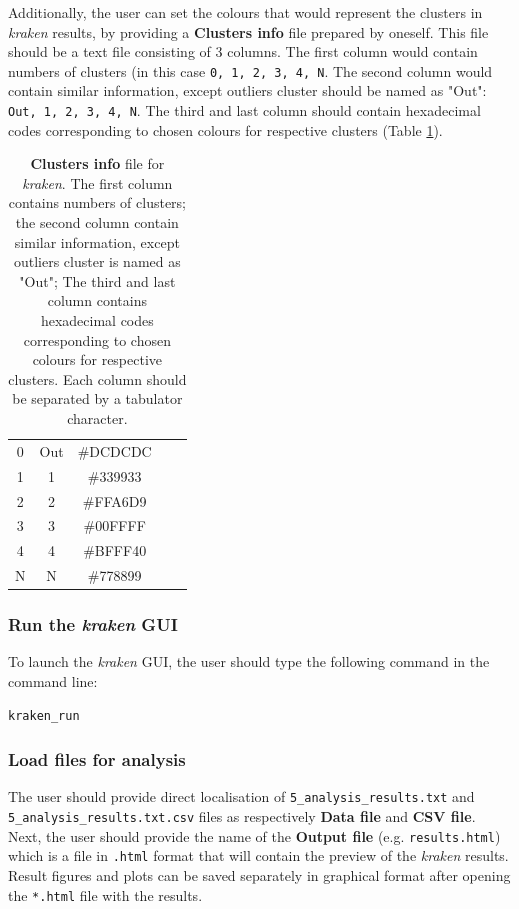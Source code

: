 \documentclass[9pt,tutorial, pubversion]{livecoms}
\begin{document}
Additionally, the user can set the colours that would represent the clusters in \textit{kraken} results, by providing a \textbf{Clusters info} file prepared by oneself. This file should be a text file consisting of 3 columns. The first column would contain numbers of clusters (in this case \texttt{0, 1, 2, 3, 4, N}. The second column would contain similar information, except outliers cluster should be named as "Out": \texttt{Out, 1, 2, 3, 4, N}. The third and last column should contain hexadecimal codes corresponding to chosen colours for respective clusters ({Table \ref{table1}}).

\begin{table}[hbt!]
\centering
\begin{tabular}{ c c c c c }
 0 & Out & \#DCDCDC \\ 
 1 & 1 & \#339933 \\  
 2 & 2 & \#FFA6D9 \\
 3 & 3 & \#00FFFF \\
 4 & 4 & \#BFFF40 \\
 N & N & \#778899
 \end{tabular}
 \caption{\textbf{Clusters info} file for \textit{kraken}. The first column contains numbers of clusters; the second column contain similar information, except outliers cluster is named as "Out"; The third and last column contains hexadecimal codes corresponding to chosen colours for respective clusters. Each column should be separated by a tabulator character.}
\label{table1}
\end{table}

\subsubsection{Run the \emph{kraken} GUI}
To launch the \textit{kraken} GUI, the user should type the following command in the command line:
\begin{lstlisting}
kraken_run 
\end{lstlisting}

\subsubsection{Load files for analysis}
The user should provide direct localisation of \newline \texttt{5\_analysis\_results.txt} and \texttt{5\_analysis\_results.txt.csv} files as respectively \textbf{Data file} and \textbf{CSV file}. Next, the user should provide the name of the \textbf{Output file} (e.g. \texttt{results.html}) which is a  file in \texttt{.html} format that will contain the preview of the \textit{kraken} results. Result figures and plots can be saved separately in graphical format after opening the \texttt{*.html} file with the results. 
\end{document}
